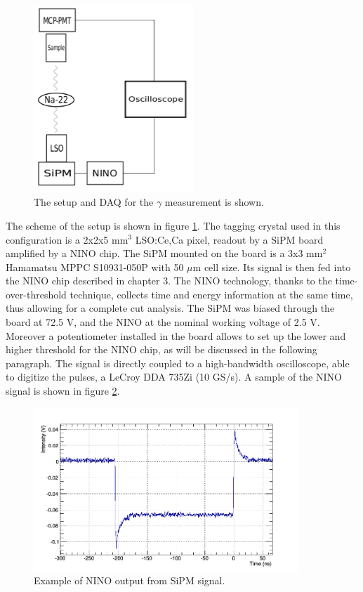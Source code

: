 \begin{figure}[htbp]
\begin{center}
\includegraphics[width=6cm]{../Pictures/Chapter_8/electronics.pdf}
\end{center}
\caption[Setup for $\gamma$ measurement]{The setup and DAQ for the $\gamma$ measurement is shown.}
\label{fig:setup}
\end{figure}
The scheme of the setup is shown in figure \ref{fig:setup}.
The tagging crystal used in this configuration is a 2x2x5 mm$^{3}$ LSO:Ce,Ca pixel, readout by a SiPM board amplified by a NINO chip. 
The SiPM mounted on the board is a 3x3 mm$^{2}$ Hamamatsu MPPC S10931-050P with 50 $\mu$m cell size.
Its signal is then fed into the NINO chip described in chapter 3. The NINO technology, thanks to the time-over-threshold technique, collects time and energy information at the same time, thus allowing for a complete cut analysis.
The SiPM was biased through the board at 72.5 V, and the NINO at the nominal working voltage of 2.5 V. Moreover a potentiometer installed in the board allows to set up the lower and higher threshold for the NINO chip, as will be discussed in the following paragraph.
The signal is directly coupled to a high-bandwidth oscilloscope, able to digitize the pulses, a LeCroy DDA 735Zi (10 GS/s).
A sample of the NINO signal is shown in figure \ref{fig:NINO_sign}.
\begin{figure}[htbp]
\begin{center}
\includegraphics[width=10cm]{../Pictures/Chapter_8/NINO_signal.png}
\end{center}
\caption[NINO signal sample]{Example of NINO output from SiPM signal.}
\label{fig:NINO_sign}
\end{figure}
